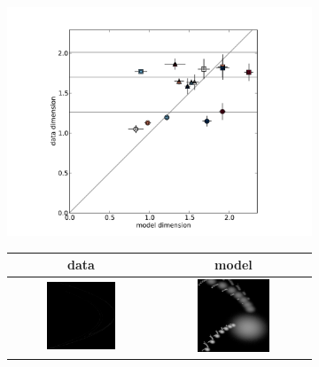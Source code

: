 \documentclass[10pt,a4paper,oneside]{article}
\theoremstyle{definition}
\begin{document}
\begin{figure}[htb]
\centering

  \begin{subfigure}[b]{0.66\textwidth}
	\includegraphics[width=\textwidth]{../img/dimension/out-table.pdf}
  \end{subfigure}
  \begin{subfigure}[b]{0.33\textwidth}
    \begin{tabular}{c c }
    data & model \\
	\hline
		\includegraphics[width=0.5\textwidth]{../img/dimension/data-henon.png} & 
		\includegraphics[width=0.5\textwidth]{../img/dimension/model-henon.png} \\

\end{tabular}
\end{subfigure}
\end{figure}
\end{document}

